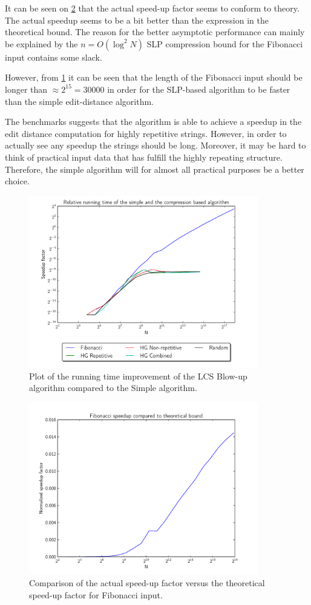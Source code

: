 \documentclass[twoside,11pt,openright]{report}
\begin{document}
It can be seen on \cref{fig:benchmark:simple-vs-lcsblowup-fib} that the actual speed-up factor seems to conform to theory. The actual speedup seems to be a bit better than the expression in the theoretical bound. The reason for the better asymptotic performance can mainly be explained by the $n = O(\log^2{N})$ SLP compression bound for the Fibonacci input contains some slack.

However, from \cref{fig:benchmark:simple-vs-lcsblowup} it can be seen that the length of the Fibonacci input should be longer than $\approx 2^{15} = 30000$ in order for the SLP-based algorithm to be faster than the simple edit-distance algorithm.

The benchmarks suggests that the algorithm is able to achieve a speedup in the edit distance computation for highly repetitive strings. However, in order to actually see any speedup the strings should be long. Moreover, it may be hard to think of practical input data that has fulfill the highly repeating structure. Therefore, the simple algorithm will for almost all practical purposes be a better choice.

\begin{figure}[!htb]
  \centering
  \includegraphics[width=10cm]{combined/simple_vs_lcs}
  \caption{Plot of the running time improvement of the LCS Blow-up algorithm compared to the Simple algorithm.}
  \label{fig:benchmark:simple-vs-lcsblowup}
\end{figure}

\begin{figure}[!htb]
  \centering
  \includegraphics[width=10cm]{combined/simple-vs-lcs-fib}
  \caption{Comparison of the actual speed-up factor versus the theoretical speed-up factor for Fibonacci input.}
  \label{fig:benchmark:simple-vs-lcsblowup-fib}
\end{figure}
\end{document}

